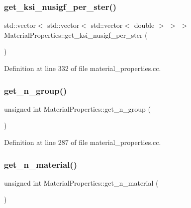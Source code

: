 \subsubsection{\texorpdfstring{get\+\_\+ksi\+\_\+nusigf\+\_\+per\+\_\+ster()}{get\_ksi\_nusigf\_per\_ster()}}
{\footnotesize\ttfamily std\+::vector$<$ std\+::vector$<$ std\+::vector$<$ double $>$ $>$ $>$ Material\+Properties\+::get\+\_\+ksi\+\_\+nusigf\+\_\+per\+\_\+ster (\begin{DoxyParamCaption}{ }\end{DoxyParamCaption})}



Definition at line 332 of file material\+\_\+properties.\+cc.

\mbox{\label{class_material_properties_ab78d4abe8fba20919d0a8d7700de0763}} 
\subsubsection{\texorpdfstring{get\+\_\+n\+\_\+group()}{get\_n\_group()}}
{\footnotesize\ttfamily unsigned int Material\+Properties\+::get\+\_\+n\+\_\+group (\begin{DoxyParamCaption}{ }\end{DoxyParamCaption})}



Definition at line 287 of file material\+\_\+properties.\+cc.

\mbox{\label{class_material_properties_a2a43f90684a6f2ad0b32e10384e13254}} 
\subsubsection{\texorpdfstring{get\+\_\+n\+\_\+material()}{get\_n\_material()}}
{\footnotesize\ttfamily unsigned int Material\+Properties\+::get\+\_\+n\+\_\+material (\begin{DoxyParamCaption}{ }\end{DoxyParamCaption})}




